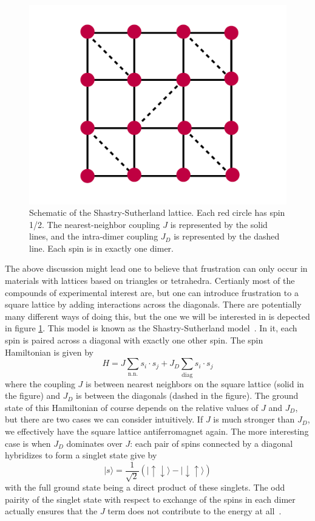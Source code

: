 \documentclass{thesis-umich}
\begin{document}
\begin{figure}
	\caption[The Shastry-Sutherland lattice]{Schematic of the Shastry-Sutherland lattice. Each red circle has spin 1/2. The nearest-neighbor coupling $J$ is represented by the solid lines, and the intra-dimer coupling $J_D$ is represented by the dashed line. Each spin is in exactly one dimer.}
	\label{fig:shastry-sutherland}
	\includegraphics[width=\columnwidth]{figures/ss-model.pdf}
\end{figure}

The above discussion might lead one to believe that frustration can only occur in materials with lattices based on triangles or tetrahedra. Certianly most of the compounds of experimental interest are, but one can introduce frustration to a square lattice by adding interactions across the diagonals. There are potentially many different ways of doing this, but the one we will be interested in is depected in figure \ref{fig:shastry-sutherland}. This model is known as the Shastry-Sutherland model~\cite{Kageyama2005}. In it, each spin is paired across a diagonal with exactly one other spin. The spin Hamiltonian is given by
\[H = J \sum_{\mathrm{n.n.}}s_i \cdot s_j + J_D\sum_{\mathrm{diag}}s_i \cdot s_j\]
where the coupling $J$ is between nearest neighbors on the square lattice (solid in the figure) and $J_D$ is between the diagonals (dashed in the figure). The ground state of this Hamiltonian of course depends on the relative values of $J$ and $J_D$, but there are two cases we can consider intuitively. If $J$ is much stronger than $J_D$, we effectively have the square lattice antiferromagnet again. The more interesting case is when $J_D$ dominates over $J$: each pair of spins connected by a diagonal hybridizes to form a singlet state give by
\[ | s \rangle = \frac{1}{\sqrt{2}}(|\uparrow \downarrow \rangle - | \downarrow \uparrow \rangle) \]
with the full ground state being a direct product of these singlets. The odd pairity of the singlet state with respect to exchange of the spins in each dimer actually ensures that the $J$ term does not contribute to the energy at all~\cite{Miyahara1999}. 
\end{document}
